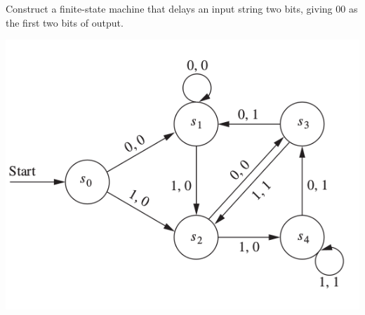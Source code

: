 \documentclass[../main.tex]{subfiles}
\begin{document}
Construct a finite-state machine that delays an input string two bits, giving $00$ as the first two bits of output.

\solution
\includegraphics[width=\textwidth]{img/A13_2_9}
\end{document}
